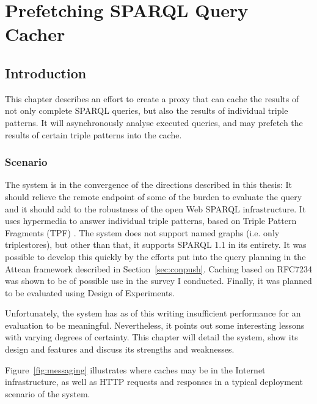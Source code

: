 
\chapter{Prefetching SPARQL Query Cacher}\label{sec:tpfcacheplanning}

\section{Introduction}

This chapter describes an effort to create a proxy that can cache the
results of not only complete SPARQL queries, but also the results of individual
triple patterns. It will asynchronously analyse executed queries, and
may prefetch the results of certain triple patterns into the cache.


\subsection{Scenario}

The system is in the convergence of the directions described in this
thesis: It should relieve the remote endpoint of some of the
burden to evaluate the query and it should add to the robustness of
the open Web SPARQL infrastructure. It uses hypermedia to answer
individual triple patterns, based on Triple Pattern Fragments (TPF)
\cite{ldf1}. The system does not support named graphs (i.e. only
triplestores), but other than that, it supports SPARQL 1.1 in its
entirety. It was possible to develop this quickly by the efforts put
into the query planning in the Attean framework described in
Section~\ref{sec:conpush}. Caching based on RFC7234 \cite{rfc7234} was
shown to be of possible use in the survey I conducted. Finally, it was
planned to be evaluated using Design of Experiments.

Unfortunately, the system has as of this writing insufficient
performance for an evaluation to be meaningful. Nevertheless, it
points out some interesting lessons with varying degrees of
certainty. This chapter will detail the system, show its design and
features and discuss its strengths and weaknesses.

Figure~\ref{fig:messaging} illustrates where caches may be in the
Internet infrastructure, as well as HTTP requests and responses in a
typical deployment scenario of the system.

